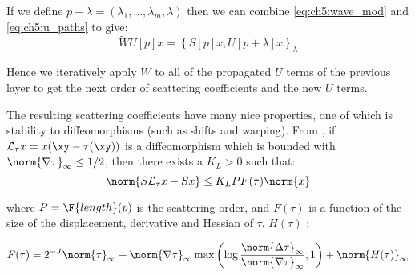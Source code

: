 If we define $p + \lambda = (\lambda_1, \ldots, \lambda_m, \lambda)$ then we can
combine \eqref{eq:ch5:wave_mod} and \eqref{eq:ch5:u_paths} to give:
%
\begin{equation}
  \tilde{W} U[p] x = \left\{S[p]x, U[p+\lambda]x \right\}_{\lambda}
\end{equation}

Hence we iteratively apply $\tilde{W}$ to all of the propagated $U$ terms of
the previous layer to get the next order of scattering coefficients and
the new $U$ terms.

The resulting scattering coefficients have many nice properties, one of which is
stability to diffeomorphisms (such as shifts and warping). From
\cite{mallat_group_2012}, if $\mathcal{L}_\tau
x = x(\xy -\tau(\xy))$ is a diffeomorphism which is bounded with 
$\norm{\nabla \tau}_{\infty} \leq 1/2$, then there exists a $K_L > 0$ such
that:
%
\begin{equation}
  \norm{ S \mathcal{L}_{\tau}x  - S x} \leq K_L P F(\tau) \norm{x}
  \label{eq:stability}
\end{equation}

where $P = \F{length}(p)$ is the scattering order, and $F(\tau)$ is a function
of the size of the displacement, derivative and Hessian of $\tau$, $H(\tau)$
\cite{mallat_group_2012}: 

\begin{equation}
  F(\tau) = 2^{-J} \norm{\tau}_{\infty} + \norm{\nabla \tau}_{\infty} \max\left(\log
  \frac{\norm{\Delta \tau}_{\infty} }{\norm{\nabla \tau}_{\infty}}, 1 \right) +
  \norm{H(\tau)}_{\infty}
\end{equation}
